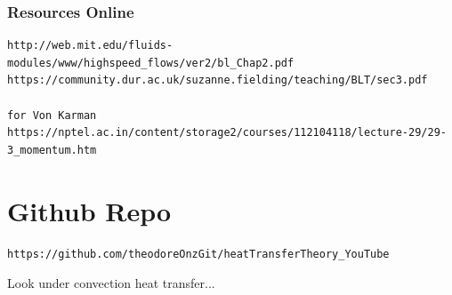 \documentclass[11pt]{article}
\begin{document}
\section{Resources Online}


\begin{verbatim}
http://web.mit.edu/fluids-modules/www/highspeed_flows/ver2/bl_Chap2.pdf
https://community.dur.ac.uk/suzanne.fielding/teaching/BLT/sec3.pdf

for Von Karman
https://nptel.ac.in/content/storage2/courses/112104118/lecture-29/29-3_momentum.htm
\end{verbatim}

\part{Github Repo}
\begin{verbatim}
https://github.com/theodoreOnzGit/heatTransferTheory_YouTube
\end{verbatim}

Look under convection heat transfer...
\end{document}
